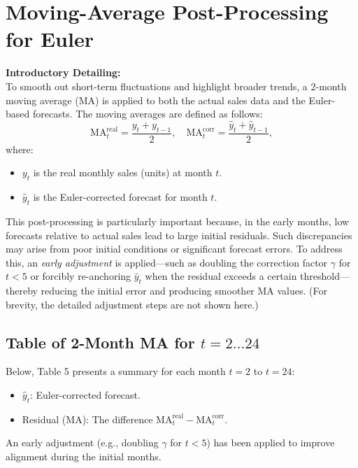 \documentclass[10pt]{article}
\begin{document}
\section{Moving-Average Post-Processing for Euler}
\label{sec:2monthMA}

\textbf{Introductory Detailing:}\\
To smooth out short-term fluctuations and highlight broader trends, a 2-month moving average (MA) is applied to both the actual sales data and the Euler-based forecasts. The moving averages are defined as follows:
\[
\text{MA}_t^{\mathrm{real}} = \frac{y_t + y_{t-1}}{2}, \quad \text{MA}_t^{\mathrm{corr}} = \frac{\hat{y}_t + \hat{y}_{t-1}}{2},
\]
where:
\begin{itemize}
    \item \(y_t\) is the real monthly sales (units) at month \(t\).
    \item \(\hat{y}_t\) is the Euler-corrected forecast for month \(t\).
\end{itemize}
This post-processing is particularly important because, in the early months, low forecasts relative to actual sales lead to large initial residuals. Such discrepancies may arise from poor initial conditions or significant forecast errors. To address this, an \emph{early adjustment} is applied—such as doubling the correction factor \(\gamma\) for \(t<5\) or forcibly re-anchoring \(\hat{y}_t\) when the residual exceeds a certain threshold—thereby reducing the initial error and producing smoother MA values. (For brevity, the detailed adjustment steps are not shown here.)

\subsection{Table of 2-Month MA for \(t=2 \ldots 24\)}
Below, Table 5 presents a summary for each month \(t=2\) to \(t=24\):
\begin{itemize}

    \item \(\hat{y}_t\): Euler-corrected forecast.
  
    \item Residual (MA): The difference \(\text{MA}_t^{\mathrm{real}} - \text{MA}_t^{\mathrm{corr}}\).
\end{itemize}
An early adjustment (e.g., doubling \(\gamma\) for \(t<5\)) has been applied to improve alignment during the initial months.
\end{document}
